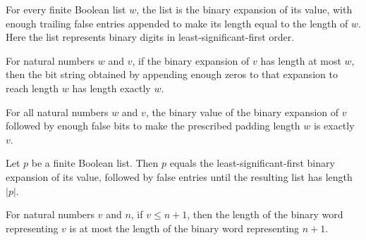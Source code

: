 \begin{lemma}
\label{Complexity.Codec.eq_bits_append_replicate}
\leanok
{}
For every finite Boolean list $w$, the list is the binary expansion of its value, with
enough trailing false entries appended to make its length equal to the length of $w$.
Here the list represents binary digits in least-significant-first order.
\end{lemma}

\begin{lemma}
\label{Complexity.Codec.length_padBits}
\leanok
{}
For natural numbers $w$ and $v$, if the binary expansion of $v$ has length at most $w$,
then the bit string obtained by appending enough zeros to that expansion to reach length
$w$ has length exactly $w$.
\end{lemma}

\begin{lemma}
\label{Complexity.Codec.bitsVal_padBits}
\leanok
{}
For all natural numbers $w$ and $v$, the binary value of the binary expansion of $v$
followed by enough false bits to make the prescribed padding length $w$ is exactly $v$.
\end{lemma}

\begin{lemma}
\label{Complexity.Codec.eq_padBits}
\leanok
{}
Let $p$ be a finite Boolean list. Then $p$ equals the least-significant-first binary
expansion of its value, followed by false entries until the resulting list has length
$|p|$.
\end{lemma}

\begin{lemma}
\label{Complexity.Codec.length_bits_pos_le}
\leanok
{}
For natural numbers $v$ and $n$, if $v\le n+1$, then the length of the binary word
representing $v$ is at most the length of the binary word representing $n+1$.
\end{lemma}

